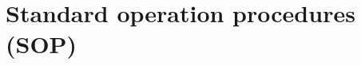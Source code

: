 \documentclass[a4paper]{article}
\begin{document}

	\section{Standard operation procedures (SOP)}

	
		
\end{document}
